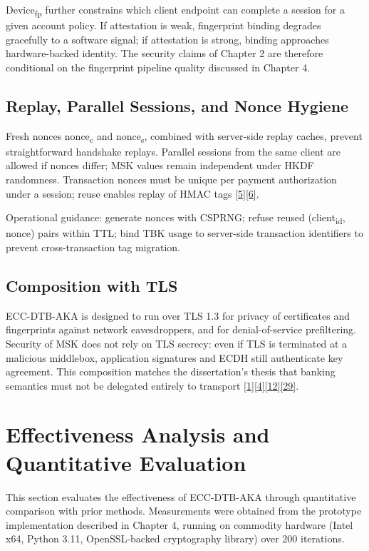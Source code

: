 \indent Device\textsubscript{fp} further constrains which client endpoint can complete a session for a given account policy. If attestation is weak, fingerprint binding degrades gracefully to a software signal; if attestation is strong, binding approaches hardware-backed identity. The security claims of Chapter 2 are therefore conditional on the fingerprint pipeline quality discussed in Chapter 4.

\subsection{Replay, Parallel Sessions, and Nonce Hygiene}

\indent Fresh nonces nonce\textsubscript{c} and nonce\textsubscript{s}, combined with server-side replay caches, prevent straightforward handshake replays. Parallel sessions from the same client are allowed if nonces differ; MSK values remain independent under HKDF randomness. Transaction nonces must be unique per payment authorization under a session; reuse enables replay of HMAC tags \hyperref[ref:5]{[5]}\hyperref[ref:6]{[6]}.

\indent Operational guidance: generate nonces with CSPRNG; refuse reused (client\textsubscript{id}, nonce) pairs within TTL; bind TBK usage to server-side transaction identifiers to prevent cross-transaction tag migration.

\subsection{Composition with TLS}

\indent ECC-DTB-AKA is designed to run over TLS 1.3 for privacy of certificates and fingerprints against network eavesdroppers, and for denial-of-service prefiltering. Security of MSK does not rely on TLS secrecy: even if TLS is terminated at a malicious middlebox, application signatures and ECDH still authenticate key agreement. This composition matches the dissertation's thesis that banking semantics must not be delegated entirely to transport \hyperref[ref:1]{[1]}\hyperref[ref:4]{[4]}\hyperref[ref:12]{[12]}\hyperref[ref:29]{[29]}.

\section{Effectiveness Analysis and Quantitative Evaluation}

\indent This section evaluates the effectiveness of ECC-DTB-AKA through quantitative comparison with prior methods. Measurements were obtained from the prototype implementation described in Chapter 4, running on commodity hardware (Intel x64, Python 3.11, OpenSSL-backed cryptography library) over 200 iterations.

